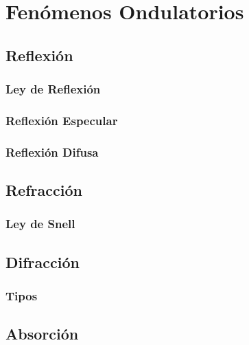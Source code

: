 \chapter{Fenómenos Ondulatorios}%
\section{Reflexión}%

\subsection{Ley de Reflexión}

\subsection{Reflexión Especular}

\subsection{Reflexión Difusa}

\section{Refracción}

\subsection{Ley de Snell}

\section{Difracción}

\subsection{Tipos}

\section{Absorción}


